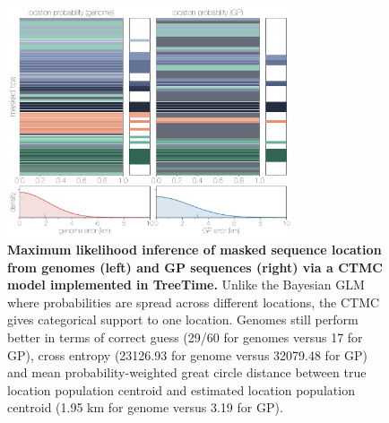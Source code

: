 \documentclass[11pt,oneside,letterpaper]{article}
\begin{document}
\begin{figure}[h]
 \centering
	\includegraphics[width=0.75\textwidth]{supp_figures/sfigX_treetimeLocations.png}
	\caption{\textbf{Maximum likelihood inference of masked sequence location from genomes (left) and GP sequences (right) via a CTMC model implemented in TreeTime.}
  Unlike the Bayesian GLM where probabilities are spread across different locations, the CTMC gives categorical support to one location.
  Genomes still perform better in terms of correct guess (29/60 for genomes versus 17 for GP), cross entropy (23126.93 for genome versus 32079.48 for GP) and mean probability-weighted great circle distance between true location population centroid and estimated location population centroid (1.95 km for genome versus 3.19 for GP).
	}
	\label{TTlocations}
\end{figure}
\end{document}
